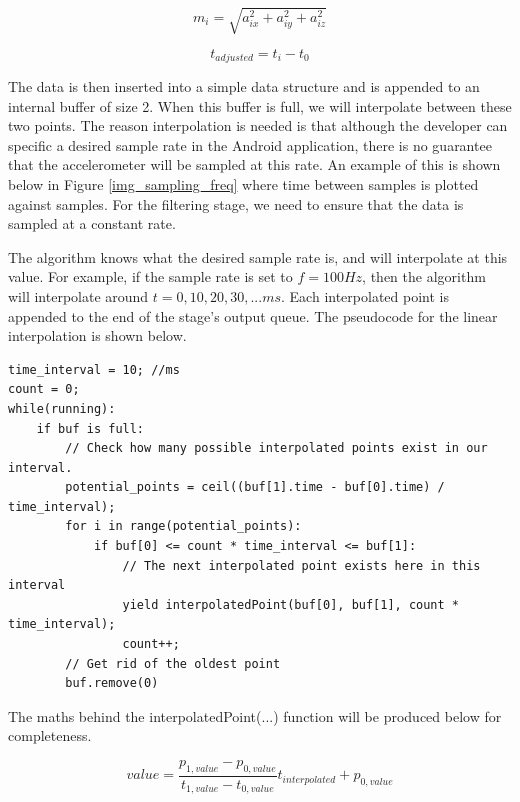             \begin{equation}
                m_i = \sqrt{a_{ix}^2 + a_{iy}^2 + a_{iz}^2}
            \end{equation}

            \begin{equation}
                t_{adjusted} = t_i - t_0
            \end{equation}

            The data is then inserted into a simple data structure and is appended to an internal buffer of size 2. When this buffer is full, we will interpolate between these two points. The reason interpolation is needed is that although the developer can specific a desired sample rate in the Android application, there is no guarantee that the accelerometer will be sampled at this rate. An example of this is shown below in Figure \ref{img_sampling_freq} where time between samples is plotted against samples. For the filtering stage, we need to ensure that the data is sampled at a constant rate.



            The algorithm knows what the desired sample rate is, and will interpolate at this value. For example, if the sample rate is set to $f = 100Hz$, then the algorithm will interpolate around $t = 0, 10, 20, 30, ... ms$. Each interpolated point is appended to the end of the stage's output queue. The pseudocode for the linear interpolation is shown below.

            \begin{lstlisting}
time_interval = 10; //ms
count = 0;
while(running):
    if buf is full:
        // Check how many possible interpolated points exist in our interval.
        potential_points = ceil((buf[1].time - buf[0].time) / time_interval);
        for i in range(potential_points):
            if buf[0] <= count * time_interval <= buf[1]:
                // The next interpolated point exists here in this interval
                yield interpolatedPoint(buf[0], buf[1], count * time_interval);
                count++;
        // Get rid of the oldest point
        buf.remove(0)
            \end{lstlisting}

            The maths behind the interpolatedPoint(...) function will be produced below for completeness.

            \begin{equation}
                value = \frac{p_{1,value} - p_{0,value}}{t_{1,value} - t_{0,value}} t_{interpolated} + p_{0,value}
            \end{equation}

